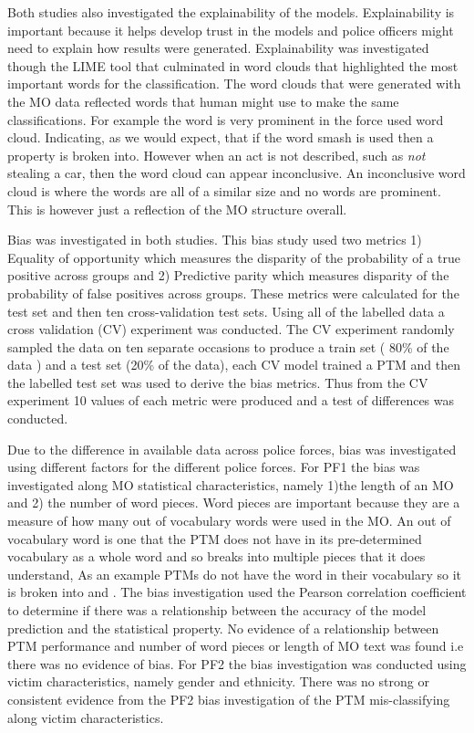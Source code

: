 Both studies also investigated the explainability of the models. Explainability is important because it helps develop trust in the models and police officers might need to explain how results were generated. Explainability was investigated though the LIME tool that culminated in word clouds that highlighted the most important words for the classification.  The word clouds that were generated with the MO data reflected words that human might use to make the same classifications. For example the word  is very prominent in the force used word cloud. Indicating, as we would expect, that if the word smash is used then a property is broken into. However when an act is not described, such as \emph{not} stealing a car, then the word cloud can appear inconclusive. An inconclusive word cloud is where the words are all of a similar size and no words are prominent. This is however just a reflection of the MO structure overall.

Bias was investigated in both studies. This bias study used two metrics 1) Equality of opportunity which measures the disparity of the probability of a true positive across groups and 2) Predictive parity which measures disparity of the probability of false positives across groups. These metrics were calculated for the test set and then ten cross-validation test sets. Using all of the labelled data a cross validation (CV) experiment was conducted. The CV experiment randomly sampled the data on ten separate occasions to produce a train set ( 80\% of the data ) and a test set (20\% of the data), each CV model trained a PTM and then the labelled test set was used to derive the bias metrics. Thus from the CV experiment 10 values of each metric were produced and a test of differences was conducted.

Due to the difference in available data across police forces, bias was investigated using different factors for the different police forces. For PF1 the bias was investigated along MO statistical characteristics, namely 1)the length of an MO and 2) the number of word pieces. Word pieces are important because they are a measure of how many out of vocabulary words were used in the MO. An out of vocabulary word is one that the PTM does not have in its pre-determined vocabulary as a whole word and so breaks into multiple pieces that it does understand, As an example PTMs do not have the word   in their vocabulary so it is broken into  and . The bias investigation used the Pearson correlation coefficient to determine if there was a relationship between the accuracy of the model prediction and the statistical property. No evidence of a relationship between PTM performance and number of word pieces or length of MO text was found i.e there was no evidence of bias. For PF2 the bias investigation was conducted using victim characteristics, namely gender and ethnicity.  There was no strong or consistent evidence from the PF2 bias investigation of the PTM mis-classifying along victim characteristics.

